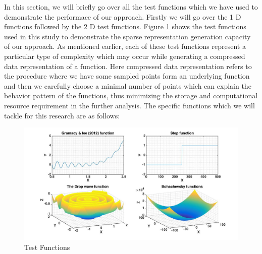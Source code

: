\documentclass[procedia]{easychair}
\begin{document}
In this section, we will briefly go over all the test functions \cite{simulationlib} which we have used to demonstrate the performace of our approach. Firstly we will go over the 1 D functions followed by the 2 D test functions. Figure \ref{fig1} shows the test functions used in this study to demonstrate the sparse representation generation capacity of our approach. As mentioned earlier, each of these test functions represent a particular type of complexity which may occur while generating a compressed data representation of a function. Here compressed data representation refers to the procedure where we have some sampled points form an underlying function and then we carefully choose a minimal number of points which can explain the behavior pattern of the functions, thus minimizing the storage and computational resource requirement in the further analysis. The specific functions which we will tackle for this research are as follows:


\begin{figure}[]  %
	\centering
	\includegraphics[width=6in]{plotfortest.jpg}
	\caption[Optional caption]{Test Functions}
	\label{fig1} %
\end{figure}
 
\end{document}
